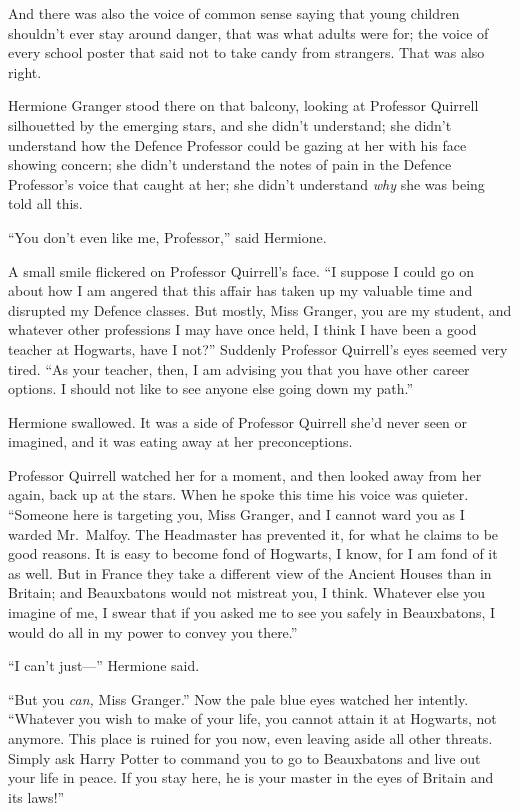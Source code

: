 And there was also the voice of common sense saying that young children
shouldn't ever stay around danger, that was what adults were for; the
voice of every school poster that said not to take candy from strangers.
That was also right.

Hermione Granger stood there on that balcony, looking at Professor
Quirrell silhouetted by the emerging stars, and she didn't understand;
she didn't understand how the Defence Professor could be gazing at her
with his face showing concern; she didn't understand the notes of pain
in the Defence Professor's voice that caught at her; she didn't
understand \emph{why} she was being told all this.

``You don't even like me, Professor,'' said Hermione.

A small smile flickered on Professor Quirrell's face. ``I suppose I
could go on about how I am angered that this affair has taken up my
valuable time and disrupted my Defence classes. But mostly, Miss
Granger, you are my student, and whatever other professions I may have
once held, I think I have been a good teacher at Hogwarts, have I not?''
Suddenly Professor Quirrell's eyes seemed very tired. ``As your teacher,
then, I am advising you that you have other career options. I should not
like to see anyone else going down my path.''

Hermione swallowed. It was a side of Professor Quirrell she'd never seen
or imagined, and it was eating away at her preconceptions.

Professor Quirrell watched her for a moment, and then looked away from
her again, back up at the stars. When he spoke this time his voice was
quieter. ``Someone here is targeting you, Miss Granger, and I cannot
ward you as I warded Mr.~Malfoy. The Headmaster has prevented it, for
what he claims to be good reasons. It is easy to become fond of
Hogwarts, I know, for I am fond of it as well. But in France they take a
different view of the Ancient Houses than in Britain; and Beauxbatons
would not mistreat you, I think. Whatever else you imagine of me, I
swear that if you asked me to see you safely in Beauxbatons, I would do
all in my power to convey you there.''

``I can't just---'' Hermione said.

``But you \emph{can,} Miss Granger.'' Now the pale blue eyes watched her
intently. ``Whatever you wish to make of your life, you cannot attain it
at Hogwarts, not anymore. This place is ruined for you now, even leaving
aside all other threats. Simply ask Harry Potter to command you to go to
Beauxbatons and live out your life in peace. If you stay here, he is
your master in the eyes of Britain and its laws!''

